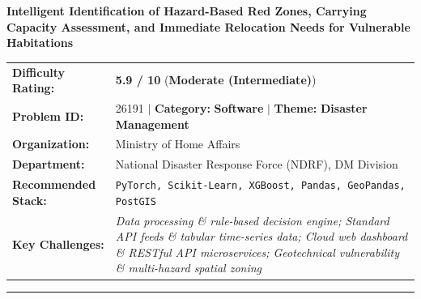\documentclass[10pt,a4paper]{article}
\begin{document}
\begin{tcolorbox}[pscard, title={"\textbf{SIH26191} \quad $\vert$ \quad Intelligent Identification of Hazard-Based Red Zones, Carrying Capacity Ass...}]
\textbf{\large Intelligent Identification of Hazard-Based Red Zones, Carrying Capacity Assessment, and Immediate Relocation Needs for Vulnerable Habitations}\\[0.25cm]

\begin{tabular}{@{}lp{12.5cm}@{}}
\textbf{Difficulty Rating:} & \textcolor{diffmod}{\textbf{\Large 5.9 / 10}} \quad (\textbf{Moderate (Intermediate)}) \\
\textbf{Problem ID:} & 26191 \quad $\vert$ \quad \textbf{Category:} \textbf{Software} \quad $\vert$ \quad \textbf{Theme:} \textbf{Disaster Management} \\
\textbf{Organization:} & Ministry of Home Affairs \\
\textbf{Department:} & National Disaster Response Force (NDRF), DM Division \\
\textbf{Recommended Stack:} & \texttt{PyTorch, Scikit-Learn, XGBoost, Pandas, GeoPandas, PostGIS} \\
\textbf{Key Challenges:} & \textit{\small Data processing \& rule-based decision engine; Standard API feeds \& tabular time-series data; Cloud web dashboard \& RESTful API microservices; Geotechnical vulnerability \& multi-hazard spatial zoning} \\
\end{tabular}

\vspace{0.2cm}
\hrule
\vspace{0.2cm}


\end{tcolorbox}
\end{document}
